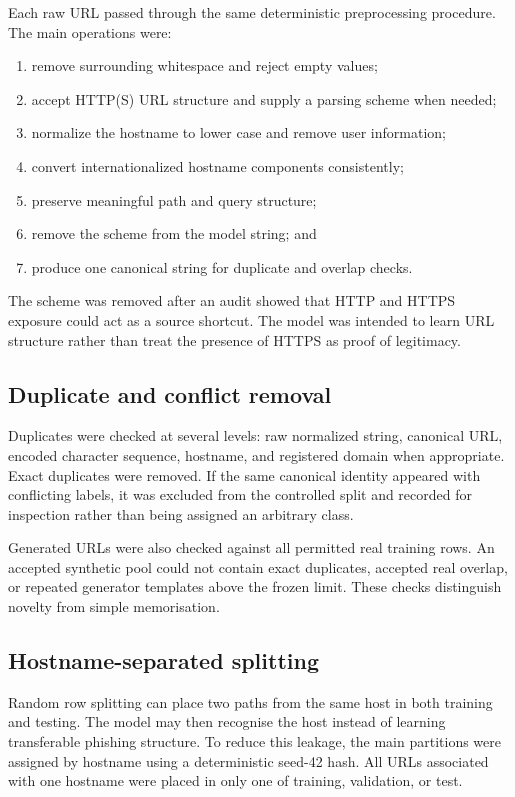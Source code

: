 Each raw URL passed through the same deterministic preprocessing procedure. The
main operations were:

\begin{enumerate}
    \item remove surrounding whitespace and reject empty values;
    \item accept HTTP(S) URL structure and supply a parsing scheme when needed;
    \item normalize the hostname to lower case and remove user information;
    \item convert internationalized hostname components consistently;
    \item preserve meaningful path and query structure;
    \item remove the scheme from the model string; and
    \item produce one canonical string for duplicate and overlap checks.
\end{enumerate}

The scheme was removed after an audit showed that HTTP and HTTPS exposure could
act as a source shortcut. The model was intended to learn URL structure rather
than treat the presence of HTTPS as proof of legitimacy.

\subsection{Duplicate and conflict removal}

Duplicates were checked at several levels: raw normalized string, canonical
URL, encoded character sequence, hostname, and registered domain when
appropriate. Exact duplicates were removed. If the same canonical identity
appeared with conflicting labels, it was excluded from the controlled split and
recorded for inspection rather than being assigned an arbitrary class.

Generated URLs were also checked against all permitted real training rows. An
accepted synthetic pool could not contain exact duplicates, accepted real
overlap, or repeated generator templates above the frozen limit. These checks
distinguish novelty from simple memorisation.

\subsection{Hostname-separated splitting}

Random row splitting can place two paths from the same host in both training and
testing. The model may then recognise the host instead of learning transferable
phishing structure. To reduce this leakage, the main partitions were assigned
by hostname using a deterministic seed-42 hash. All URLs associated with one
hostname were placed in only one of training, validation, or test.

